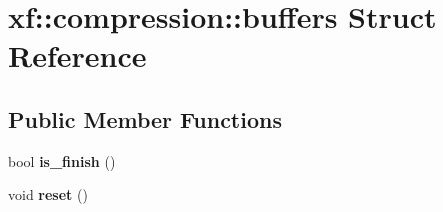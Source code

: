 \hypertarget{structxf_1_1compression_1_1buffers}{\section{xf\-:\-:compression\-:\-:buffers Struct Reference}
\label{structxf_1_1compression_1_1buffers}
}
\subsection*{Public Member Functions}
\begin{DoxyCompactItemize}
\item 
\hypertarget{structxf_1_1compression_1_1buffers_a466c8a11999f831539460966f7c6761f}{bool {\bfseries is\-\_\-finish} ()}\label{structxf_1_1compression_1_1buffers_a466c8a11999f831539460966f7c6761f}

\item 
\hypertarget{structxf_1_1compression_1_1buffers_a4e4c29d5dd403c8712d6f22091bf2ac9}{void {\bfseries reset} ()}\label{structxf_1_1compression_1_1buffers_a4e4c29d5dd403c8712d6f22091bf2ac9}

\end{DoxyCompactItemize}
